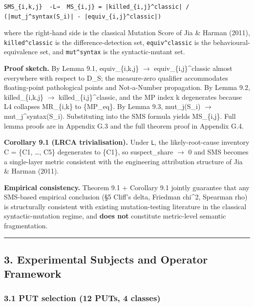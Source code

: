 \documentclass[review,12pt,authoryear]{elsarticle}
\begin{document}
\begin{verbatim}
SMS_{i,k,j}  -L→  MS_{i,j} = |killed_{i,j}^classic| / (|mut_j^syntax(S_i)| - |equiv_{i,j}^classic|)
\end{verbatim}

where the right-hand side is the classical Mutation Score of Jia \&
Harman (2011), \texttt{killed\^{}classic} is the difference-detection
set, \texttt{equiv\^{}classic} is the behavioural-equivalence set, and
\texttt{mut\^{}syntax} is the syntactic-mutant set.

\textbf{Proof sketch.} By Lemma 9.1, equiv\_\{i,k,j\} $\to$
equiv\_\{i,j\}\^{}classic almost everywhere with respect to D\_S; the
measure-zero qualifier accommodates floating-point pathological points
and Not-a-Number propagation. By Lemma 9.2, killed\_\{i,k,j\} $\to$
killed\_\{i,j\}\^{}classic, and the MP index k degenerates because L4
collapses MR\_\{i,k\} to \{MP\_eq\}. By Lemma 9.3, mut\_j(S\_i) $\to$
mut\_j\^{}syntax(S\_i). Substituting into the SMS formula yields
MS\_\{i,j\}. Full lemma proofs are in Appendix G.3 and the full theorem
proof in Appendix G.4.

\textbf{Corollary 9.1 (LRCA trivialisation).} Under \texttt{L}, the
likely-root-cause inventory C = \{C1, \ldots, C5\} degenerates to
\{C1\}, so suspect\_share $\to$ 0 and SMS becomes a single-layer metric
consistent with the engineering attribution structure of Jia \& Harman
(2011).

\textbf{Empirical consistency.} Theorem 9.1 + Corollary 9.1 jointly
guarantee that any SMS-based empirical conclusion (§5 Cliff's delta,
Friedman chi\^{}2, Spearman rho) is structurally consistent with
existing mutation-testing literature in the classical syntactic-mutation
regime, and \textbf{does not} constitute metric-level semantic
fragmentation.

\begin{center}\rule{0.5\linewidth}{0.5pt}\end{center}

\subsection{3. Experimental Subjects and Operator
Framework}\label{experimental-subjects-and-operator-framework}

\subsubsection{3.1 PUT selection (12 PUTs, 4
classes)}\label{put-selection-12-puts-4-classes}
\end{document}
